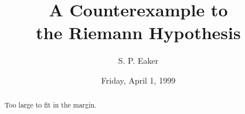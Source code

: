 \documentclass[someoption]{UAmathtalk}
\author{S. P. Eaker}
\title{A Counterexample to\\ the Riemann Hypothesis}
\date{Friday, April 1, 1999}
\begin{document}
\maketitle

\begin{abstract}
  Too large to fit in the margin.
\end{abstract}
\end{document}
